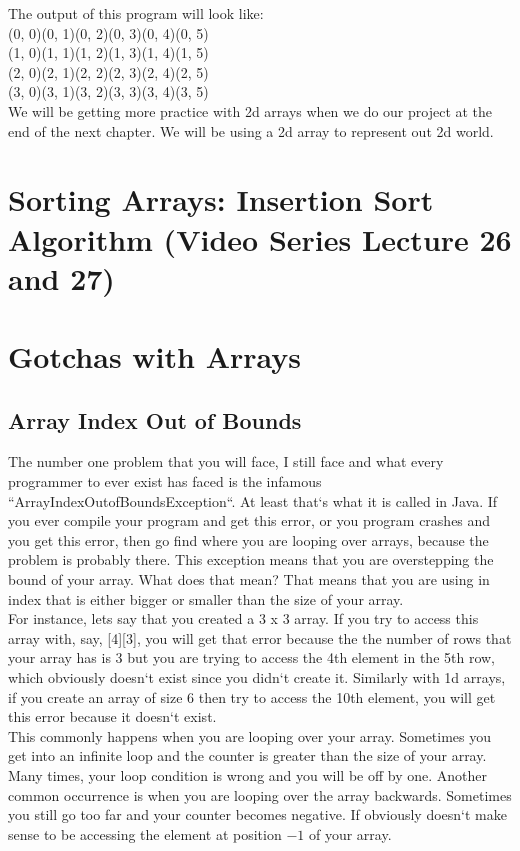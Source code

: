 \documentclass[11]{article}
\begin{document}
The output of this program will look like:\\
(0, 0)(0, 1)(0, 2)(0, 3)(0, 4)(0, 5)\\(1, 0)(1, 1)(1, 2)(1, 3)(1, 4)(1, 5)\\(2, 0)(2, 1)(2, 2)(2, 3)(2, 4)(2, 5)\\(3, 0)(3, 1)(3, 2)(3, 3)(3, 4)(3, 5)\\

We will be getting more practice with 2d arrays when we do our project at the end of the next chapter. We will be using a 2d array to represent out 2d world.

\section{Sorting Arrays: Insertion Sort Algorithm (Video Series Lecture 26 and 27)}
\section{Gotchas with Arrays}
\label{sec:gotchas}
\subsection{Array Index Out of Bounds}
The number one problem that you will face, I still face and what every programmer to ever exist has faced is the infamous ``ArrayIndexOutofBoundsException``. At least that`s what it is called in Java. If you ever compile your program and get this error, or you program crashes and you get this error, then go find where you are looping over arrays, because the problem is probably there. This exception means that you are overstepping the bound of your array. What does that mean? That means that you are using in index that is either bigger or smaller than the size of your array.\\

For instance, lets say that you created a 3 x 3 array. If you try to access this array with, say, [4][3], you will get that error because the the number of rows that your array has is 3 but you are trying to access the 4th element in the 5th row, which obviously doesn`t exist since you didn`t create it. Similarly with 1d arrays, if you create an array of size 6 then try to access the 10th element, you will get this error because it doesn`t exist.\\

This commonly happens when you are looping over your array. Sometimes you get into an infinite loop and the counter is greater than the size of your array. Many times, your loop condition is wrong and you will be off by one. Another common occurrence is when you are looping over the array backwards. Sometimes you still go too far and your counter becomes negative. If obviously doesn`t make sense to be accessing the element at position $-1$ of your array.\\
\end{document}
